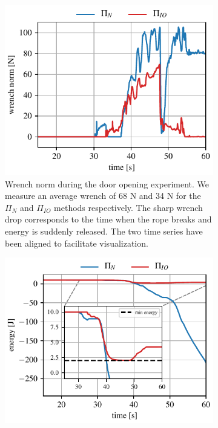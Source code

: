 \begin{figure}[t]
\centering
\hspace*{-0.0cm} 
\begin{subfigure}{0.9\columnwidth}
    \includegraphics[width=\linewidth]{figures/hardware_experiments/wrench_norm.pdf}
    \caption{Wrench norm during the door opening experiment. We measure an average wrench of 68 N and 34 N for the $\Pi_{N}$ and $\Pi_{IO}$ methods respectively. The sharp wrench drop corresponds to the time when the rope breaks and energy is suddenly released. The two time series have been aligned to facilitate visualization.}
\end{subfigure}
\hspace*{-0.2cm} 
\begin{subfigure}{0.9\columnwidth}
    \includegraphics[width=\linewidth]{figures/hardware_experiments/energy_tank.pdf}

\end{subfigure}
\end{figure}
